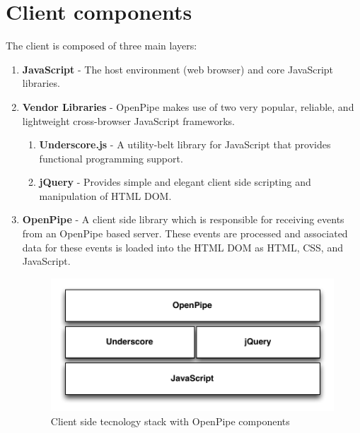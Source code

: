 \documentclass[12pt]{report}
\begin{document}
\section{Client components}

The client is composed of three main layers:

\begin{enumerate}
	\item \textbf{JavaScript} - The host environment (web browser) and core JavaScript libraries.
	\item \textbf{Vendor Libraries} - OpenPipe makes use of two very popular, reliable, and lightweight cross-browser JavaScript frameworks.
		\begin{enumerate} 
			\item \textbf{Underscore.js} - A utility-belt library for JavaScript that provides functional programming support.
			\item \textbf{jQuery} - Provides simple and elegant client side scripting and manipulation of HTML DOM.
		\end{enumerate}
	\item \textbf{OpenPipe} - A client side library which is responsible for receiving events from an OpenPipe based server. These events are processed and associated data for these events is loaded into the HTML DOM as HTML, CSS, and JavaScript.
		
		\begin{figure}[H]
		\label{fig:clientFrameworkStack}
		\centering
		\includegraphics[width=\textwidth,keepaspectratio]{figures/images/client_stack.pdf}
		\caption{Client side tecnology stack with OpenPipe components}
		\end{figure}

\end{enumerate}




\end{document}
